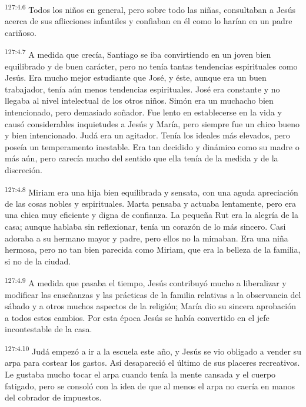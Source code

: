 \par
\textsuperscript{127:4.6} Todos los niños en general, pero sobre todo las niñas, consultaban a Jesús acerca de sus aflicciones infantiles y confiaban en él como lo harían en un padre cariñoso.

\par
\textsuperscript{127:4.7} A medida que crecía, Santiago se iba convirtiendo en un joven bien equilibrado y de buen carácter, pero no tenía tantas tendencias espirituales como Jesús. Era mucho mejor estudiante que José, y éste, aunque era un buen trabajador, tenía aún menos tendencias espirituales. José era constante y no llegaba al nivel intelectual de los otros niños. Simón era un muchacho bien intencionado, pero demasiado soñador. Fue lento en establecerse en la vida y causó considerables inquietudes a Jesús y María, pero siempre fue un chico bueno y bien intencionado. Judá era un agitador. Tenía los ideales más elevados, pero poseía un temperamento inestable. Era tan decidido y dinámico como su madre o más aún, pero carecía mucho del sentido que ella tenía de la medida y de la discreción.

\par
\textsuperscript{127:4.8} Miriam era una hija bien equilibrada y sensata, con una aguda apreciación de las cosas nobles y espirituales. Marta pensaba y actuaba lentamente, pero era una chica muy eficiente y digna de confianza. La pequeña Rut era la alegría de la casa; aunque hablaba sin reflexionar, tenía un corazón de lo más sincero. Casi adoraba a su hermano mayor y padre, pero ellos no la mimaban. Era una niña hermosa, pero no tan bien parecida como Miriam, que era la belleza de la familia, si no de la ciudad.

\par
\textsuperscript{127:4.9} A medida que pasaba el tiempo, Jesús contribuyó mucho a liberalizar y modificar las enseñanzas y las prácticas de la familia relativas a la observancia del sábado y a otros muchos aspectos de la religión; María dio su sincera aprobación a todos estos cambios. Por esta época Jesús se había convertido en el jefe incontestable de la casa.

\par
\textsuperscript{127:4.10} Judá empezó a ir a la escuela este año, y Jesús se vio obligado a vender su arpa para costear los gastos. Así desapareció el último de sus placeres recreativos. Le gustaba mucho tocar el arpa cuando tenía la mente cansada y el cuerpo fatigado, pero se consoló con la idea de que al menos el arpa no caería en manos del cobrador de impuestos.

